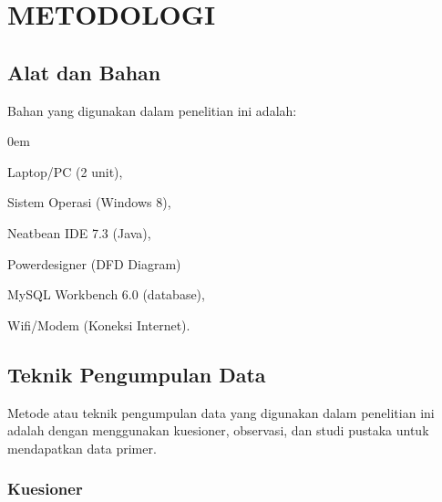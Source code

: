 \documentclass{jtetiproposalskripsi}
\begin{document}
\chapter{METODOLOGI}

\section{Alat dan Bahan}
Bahan yang digunakan dalam penelitian ini adalah:

\vspace{-0.5cm}

\begin{enumerate}[a.]
\begin{singlespace}
\itemsep0em
\item Laptop/PC (2 unit),
\item Sistem Operasi (Windows 8),
\item Neatbean IDE 7.3 (Java),
\item Powerdesigner (DFD Diagram)
\item MySQL Workbench 6.0 (database),
\item Wifi/Modem (Koneksi Internet).
\end{singlespace}
\end{enumerate}

\section{Teknik Pengumpulan Data}

Metode atau teknik pengumpulan data yang digunakan dalam penelitian ini adalah dengan menggunakan kuesioner, observasi, dan studi pustaka untuk mendapatkan data primer.
\subsection{Kuesioner}
\end{document}
